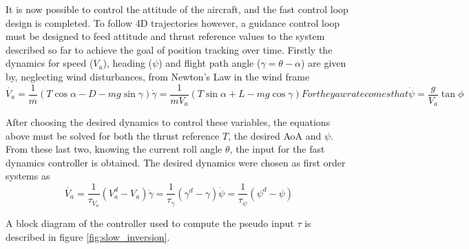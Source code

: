 It is now possible to control the attitude of the aircraft, and the fast control loop design is completed. To follow 4D trajectories however, a guidance control loop must be designed to feed attitude and thrust reference values to the system described so far to achieve the goal of position tracking over time. Firstly the dynamics for speed ($V_a$), heading ($\psi$) and flight path angle ($\gamma = \theta - \alpha$) are given by, neglecting wind disturbances, from Newton's Law in the wind frame
\begin{subequations}
\begin{equation}
\dot{V_a} = \dfrac{1}{m}(T\cos \alpha -D - mg\sin \gamma)
\label{eq:va_dot}
\end{equation}
\begin{equation}
\dot{\gamma} = \dfrac{1}{mV_a}(T\sin \alpha +L - mg\cos \gamma)
\label{eq:gamma_dot}
\end{equation}
For the yaw rate comes that 

\begin{equation}
\dot{\psi} = \dfrac{g}{V_a} \tan \phi
\label{eq:psi_dot}
\end{equation}
\end{subequations}


After choosing the desired dynamics to control these variables, the equations above must be solved for both the thrust reference $T$, the desired AoA and $\psi$. From these last two, knowing the current roll angle $\theta$, the input for the fast dynamics controller is obtained. The desired dynamics were chosen as first order systems as
\begin{subequations}
\begin{equation}
\dot{V_a} = \dfrac{1}{\tau_{V_a}}(V_a^d-V_a)
\label{eq:va_dot_des}
\end{equation}
\begin{equation}
\dot{\gamma} = \dfrac{1}{\tau_{\gamma}}(\gamma^d-\gamma)
\label{eq:gamma_dot_des}
\end{equation}
\begin{equation}
\dot{\psi} = \dfrac{1}{\tau_{\psi}}(\psi^d-\psi)
\label{eq:psi_dot_des}
\end{equation}
\end{subequations}

A block diagram of the controller used to compute the pseudo input $\tau$ is described in figure \ref{fig:slow_inversion}.

